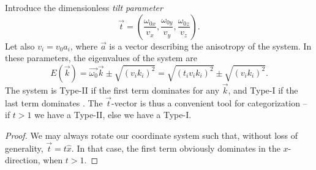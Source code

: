 Introduce the dimensionless \emph{tilt parameter}
\[
  \vec{t} =
  \left(
  \frac{\omega_{0x}}{v_{x}},
  \frac{\omega_{0y}}{v_{y}},
  \frac{\omega_{0z}}{v_{z}}
\right).
\]
Let also \(v_{i} = v_{0} a_{i}\), where \(\vec{a}\) is a vector describing the anisotropy of the system.
In these parameters, the eigenvalues of the system are
\begin{equation}
  \label{eq:14}
  E(\vec{k}) = \vec{\omega_{0}} \vec{k} \pm \sqrt{(v_{i} k_{i})^{2}} = \sqrt{(t_{i} v_{i} k_{i})^{2}} \pm \sqrt{(v_{i} k_{i})^{2}}.
\end{equation}
The system is Type-II if the first term dominates for any \(\vec{k}\), and Type-I if the last term dominates \cite{soluyanovTypeIIWeylSemimetals2015}.
The \(\vec{t}\)-vector is thus a convenient tool for categorization -- if \(t > 1\) we have a Type-II, else we have a Type-I.
\begin{proof}
  We may always rotate our coordinate system such that, without loss of generality, \(\vec{t} = t \hat{x}\).
  In that case, the first term obviously dominates in the \(x\)-direction, when $t>1$.
\end{proof}


